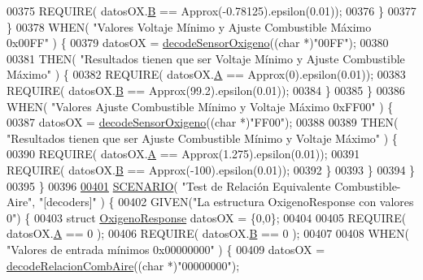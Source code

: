 \begin{DoxyCode}
{{{00375                 REQUIRE( datosOX.\hyperlink{structOxigenoResponse_a96b19152dd001e19d1351e2d97f22736}{B} == Approx(-0.78125).epsilon(0.01));
00376             \}
00377         \}
00378         WHEN( \textcolor{stringliteral}{"Valores Voltaje Mínimo y Ajuste Combustible Máximo 0x00FF"} ) \{
00379             datosOX = \hyperlink{decoders_8cpp_a5b53fc5fc37fbee9c5e389f6c8c18438}{decodeSensorOxigeno}((\textcolor{keywordtype}{char} *)\textcolor{stringliteral}{"00FF"});
00380 
00381             THEN( \textcolor{stringliteral}{"Resultados tienen que ser Voltaje Mínimo y Ajuste Combustible Máximo"} ) \{
00382                 REQUIRE( datosOX.\hyperlink{structOxigenoResponse_a068c403e5746226cf22bb020b4c786d3}{A} == Approx(0).epsilon(0.01));
00383                 REQUIRE( datosOX.\hyperlink{structOxigenoResponse_a96b19152dd001e19d1351e2d97f22736}{B} == Approx(99.2).epsilon(0.01));
00384             \}
00385         \}
00386         WHEN( \textcolor{stringliteral}{"Valores Ajuste Combustible Mínimo y Voltaje Máximo 0xFF00"} ) \{
00387             datosOX = \hyperlink{decoders_8cpp_a5b53fc5fc37fbee9c5e389f6c8c18438}{decodeSensorOxigeno}((\textcolor{keywordtype}{char} *)\textcolor{stringliteral}{"FF00"});
00388 
00389             THEN( \textcolor{stringliteral}{"Resultados tienen que ser Ajuste Combustible Mínimo y Voltaje Máximo"} ) \{
00390                 REQUIRE( datosOX.\hyperlink{structOxigenoResponse_a068c403e5746226cf22bb020b4c786d3}{A} == Approx(1.275).epsilon(0.01));
00391                 REQUIRE( datosOX.\hyperlink{structOxigenoResponse_a96b19152dd001e19d1351e2d97f22736}{B} == Approx(-100).epsilon(0.01));
00392             \}
00393         \}
00394     \}
00395 \}
00396 
\hyperlink{UnitTestCase_8cpp_ad6f2a6821f17834d70717ea1d0b38dee}{00401} \hyperlink{UnitTestCase_8cpp_aa6afb62ebdd4c3e07996c995f623eb6b}{SCENARIO}( \textcolor{stringliteral}{"Test de Relación Equivalente Combustible-Aire"}, \textcolor{stringliteral}{"[decoders]"} ) \{
00402     GIVEN(\textcolor{stringliteral}{"La estructura OxigenoResponse con valores 0"}) \{
00403         \textcolor{keyword}{struct }\hyperlink{structOxigenoResponse}{OxigenoResponse} datosOX = \{0,0\};
00404 
00405         REQUIRE( datosOX.\hyperlink{structOxigenoResponse_a068c403e5746226cf22bb020b4c786d3}{A} == 0 );
00406         REQUIRE( datosOX.\hyperlink{structOxigenoResponse_a96b19152dd001e19d1351e2d97f22736}{B} == 0 );
00407 
00408         WHEN( \textcolor{stringliteral}{"Valores de entrada mínimos 0x00000000"} ) \{
00409             datosOX = \hyperlink{decoders_8cpp_a363bd4f505969098be58a175f02b9b50}{decodeRelacionCombAire}((\textcolor{keywordtype}{char} *)\textcolor{stringliteral}{"00000000"});
}}}
\end{DoxyCode}
